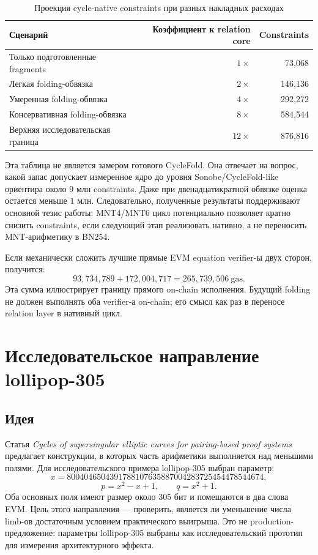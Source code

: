 \documentclass[12pt,a4paper]{article}
\newcommand{\Gas}{\mathrm{gas}}
\begin{document}
\begin{table}[htbp]
\centering
\caption{Проекция cycle-native constraints при разных накладных расходах}
\small
\begin{tabular}{l r r}
\toprule
Сценарий & Коэффициент к relation core & Constraints \\
\midrule
Только подготовленные fragments & $1\times$ & 73,068 \\
Легкая folding-обвязка & $2\times$ & 146,136 \\
Умеренная folding-обвязка & $4\times$ & 292,272 \\
Консервативная folding-обвязка & $8\times$ & 584,544 \\
Верхняя исследовательская граница & $12\times$ & 876,816 \\
\bottomrule
\end{tabular}
\end{table}

Эта таблица не является замером готового CycleFold. Она отвечает на вопрос,
какой запас допускает измеренное ядро до уровня Sonobe/CycleFold-like
ориентира около $9$ млн constraints. Даже при двенадцатикратной обвязке
оценка остается меньше $1$ млн. Следовательно, полученные результаты
поддерживают основной тезис работы: MNT4/MNT6 цикл потенциально позволяет
кратно снизить constraints, если следующий этап реализовать нативно, а не
переносить MNT-арифметику в BN254.

Если механически сложить лучшие прямые EVM equation verifier-ы двух сторон,
получится:
\[
    93{,}734{,}789+172{,}004{,}717
    =265{,}739{,}506\ \Gas.
\]
Эта сумма иллюстрирует границу прямого on-chain исполнения. Будущий folding
не должен выполнять оба verifier-а on-chain; его смысл как раз в переносе
relation layer в нативный цикл.

\section{Исследовательское направление lollipop-305}

\subsection{Идея}

Статья \emph{Cycles of supersingular elliptic curves for pairing-based proof
systems}~\cite{eprint1627} предлагает конструкции, в которых часть
арифметики выполняется над меньшими полями. Для исследовательского примера
lollipop-305 выбран параметр:
\[
    x=8004046504391788107635887004283725454478544674,
\]
\[
    p=x^2-x+1,\qquad q=x^2+1.
\]
Оба основных поля имеют размер около 305 бит и помещаются в два слова EVM.
Цель этого направления --- проверить, является ли уменьшение числа limb-ов
достаточным условием практического выигрыша. Это не production-предложение:
параметры lollipop-305 выбраны как исследовательский прототип для измерения
архитектурного эффекта.
\end{document}
